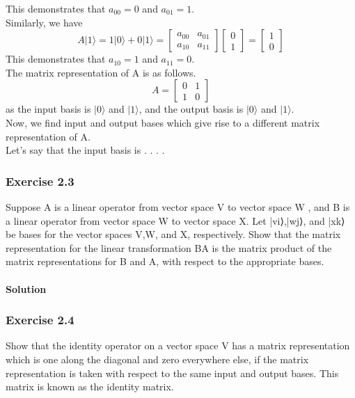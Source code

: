 \documentclass{article}
\begin{document}
This demonstrates that $a_{00} = 0$ and $a_{01} = 1$. \\    
Similarly, we have
\begin{equation}
    A|1\rangle = 
    1|0\rangle + 0|1\rangle
    =
    \begin{bmatrix}
        a_{00} & a_{01} \\
        a_{10} & a_{11}
    \end{bmatrix}
    \begin{bmatrix}
        0 \\
        1
    \end{bmatrix}
    =
    \begin{bmatrix}
        1 \\
        0
    \end{bmatrix}
\end{equation}
This demonstrates that $a_{10} = 1$ and $a_{11} = 0$. \\
The matrix representation of A is as follows. \\
\begin{equation}
    A =
    \begin{bmatrix}
        0 & 1 \\
        1 & 0
    \end{bmatrix}
\end{equation}
as the input basis is $|0\rangle$ and $|1\rangle$, and the output basis is $|0\rangle$ and $|1\rangle$. \\
Now, we find input and output bases which give rise to a different matrix representation of A. \\
Let's say that the input basis is 
.
.
.
.




\subsubsection{Exercise 2.3}
Suppose A is a linear operator from vector space V to vector space W , 
and B is a linear operator from vector space W to vector space X. 
Let |vi⟩,|wj⟩, and |xk⟩ be bases for the vector spaces V,W, and X, respectively. 
Show that the matrix representation for the linear transformation BA is the matrix product of the matrix representations for B and A, 
with respect to the appropriate bases. \\ \\

\textbf{Solution} \\


\subsubsection{Exercise 2.4}
Show that the identity operator on a vector space V has a matrix representation which is one along the diagonal and zero everywhere else, 
if the matrix representation is taken with respect to the same input and output bases. This matrix is known as the identity matrix.
\end{document}
